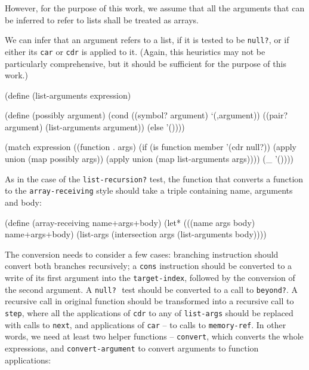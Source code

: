 However, for the purpose of this work, we assume that all the arguments
that can be inferred to refer to lists shall be treated as arrays.

We can infer that an argument refers to a list, if it is tested to
be \texttt{null?}, or if either its \texttt{car} or \texttt{cdr}
is applied to it. (Again, this heuristics may not be particularly
comprehensive, but it should be sufficient for the purpose of this work.)

\begin{Snippet}
  (define (list-arguments expression)
\end{Snippet}
\begin{Snippet}
    (define (possibly argument)
      (cond ((symbol? argument)
	     `(,argument))
	    ((pair? argument)
	     (list-arguments argument))
	    (else
	     '())))
\end{Snippet}
\begin{Snippet}
    (match expression
      ((function . args)
       (if (is function member '(cdr null?))
	   (apply union (map possibly args))
	   (apply union (map list-arguments args))))
      (_
       '())))
\end{Snippet}

As in the case of the \texttt{list-recursion?}\,\,test, the function
that converts a function to the \texttt{array-receiving} style should
take a triple containing name, arguments and body:

\begin{Snippet}
  (define (array-receiving name+args+body)
    (let* (((name args body) name+args+body)
           (list-args (intersection args (list-arguments body))))
\end{Snippet}

The conversion needs to consider a few cases: branching instruction
should convert both branches recursively; a \texttt{cons} instruction
should be converted to a write of its first argument into
the \texttt{target-index}, followed by the conversion of the second
argument. A \texttt{null?}\,\, test should be converted to a
call to \texttt{beyond?}. A recursive call in original function should
be transformed into a recursive call to \texttt{step}, where all
the applications of \texttt{cdr} to any of \texttt{list-args}
should be replaced with calls to \texttt{next}, and applications
of \texttt{car} -- to calls to \texttt{memory-ref}. In other words,
we need at least two helper functions -- \texttt{convert}, which
converts the whole expressions, and \texttt{convert-argument}
to convert arguments to function applications:

